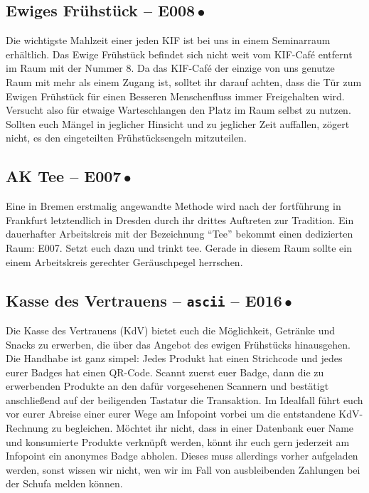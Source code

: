 \subsection*{Ewiges Frühstück -- E008{\,\color{StripeBreakfast}$\bullet$\,}}
Die wichtigste Mahlzeit einer jeden KIF ist bei uns in einem Seminarraum erhältlich.
Das Ewige Frühstück befindet sich nicht weit vom KIF-Café entfernt im Raum mit der Nummer 8.
Da das KIF-Café der einzige von uns genutze Raum mit mehr als einem Zugang ist, solltet ihr darauf achten, dass die Tür zum Ewigen Frühstück für einen Besseren Menschenfluss immer Freigehalten wird.
Versucht also für etwaige Warteschlangen den Platz im Raum selbst zu nutzen.
Sollten euch Mängel in jeglicher Hinsicht und zu jeglicher Zeit auffallen, zögert nicht, es den eingeteilten Frühstücksengeln mitzuteilen.

\subsection*{AK Tee -- E007{\,\color{StripeTea}$\bullet$\,}}
Eine in Bremen erstmalig angewandte Methode wird nach der fortführung in Frankfurt letztendlich in Dresden durch ihr drittes Auftreten zur Tradition.
Ein dauerhafter Arbeitskreis mit der Bezeichnung \enquote{Tee} bekommt einen dedizierten Raum: E007.
Setzt euch dazu und trinkt tee.
Gerade in diesem Raum sollte ein einem Arbeitskreis gerechter Geräuschpegel herrschen.

\subsection*{Kasse des Vertrauens -- \texttt{ascii} -- E016{\,\color{StripeKdV}$\bullet$\,}}
Die Kasse des Vertrauens (KdV) bietet euch die Möglichkeit, Getränke und Snacks zu erwerben, die über das Angebot des ewigen Frühstücks hinausgehen.
Die Handhabe ist ganz simpel: Jedes Produkt hat einen Strichcode und jedes eurer Badges hat einen QR-Code.
Scannt zuerst euer Badge, dann die zu erwerbenden Produkte an den dafür vorgesehenen Scannern und bestätigt anschließend auf der beiligenden Tastatur die Transaktion.
Im Idealfall führt euch vor eurer Abreise einer eurer Wege am Infopoint vorbei um die entstandene KdV-Rechnung zu begleichen.
Möchtet ihr nicht, dass in einer Datenbank euer Name und konsumierte Produkte verknüpft werden, könnt ihr euch gern jederzeit am Infopoint ein anonymes Badge abholen.
Dieses muss allerdings vorher aufgeladen werden, sonst wissen wir nicht, wen wir im Fall von ausbleibenden Zahlungen bei der Schufa melden können.

